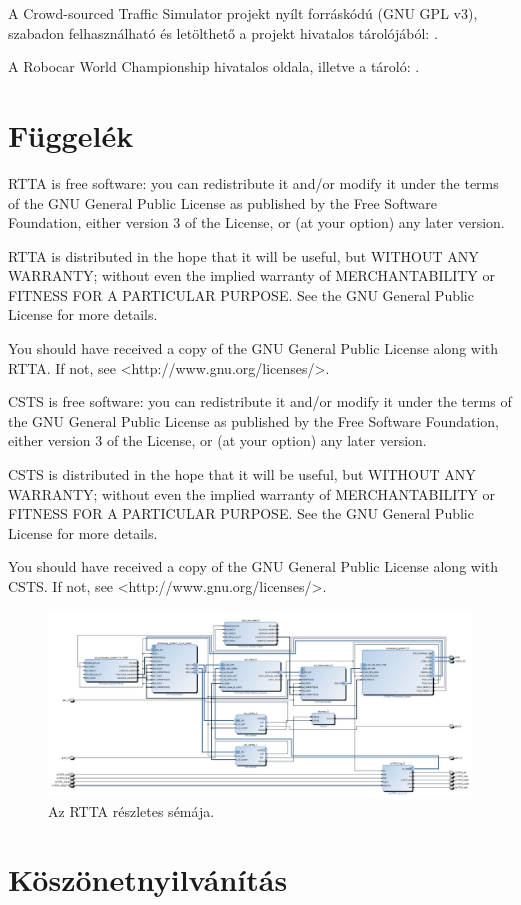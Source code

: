 \documentclass[a4paper,12pt]{report}
\begin{document}
A Crowd-sourced Traffic Simulator projekt nyílt forráskódú (GNU GPL v3), szabadon felhasználható és letölthető a projekt hivatalos tárolójából: \cite{csts}.

A Robocar World Championship hivatalos oldala, illetve a tároló: \cite{oocwcrepo}.


\chapter*{Függelék}

\noindent
RTTA is free software: you can redistribute it and/or modify
it under the terms of the GNU General Public License as published by
the Free Software Foundation, either version 3 of the License, or
(at your option) any later version.

\noindent
RTTA is distributed in the hope that it will be useful,
but WITHOUT ANY WARRANTY; without even the implied warranty of
MERCHANTABILITY or FITNESS FOR A PARTICULAR PURPOSE.  See the
GNU General Public License for more details.

\noindent
You should have received a copy of the GNU General Public License
along with RTTA. If not, see <http://www.gnu.org/licenses/>.

\noindent
CSTS is free software: you can redistribute it and/or modify
it under the terms of the GNU General Public License as published by
the Free Software Foundation, either version 3 of the License, or
(at your option) any later version.

\noindent
CSTS is distributed in the hope that it will be useful,
but WITHOUT ANY WARRANTY; without even the implied warranty of
MERCHANTABILITY or FITNESS FOR A PARTICULAR PURPOSE.  See the
GNU General Public License for more details.

\noindent
You should have received a copy of the GNU General Public License
along with CSTS. If not, see <http://www.gnu.org/licenses/>.


\begin{figure}
    \centering
    \includegraphics[width=10in]{img/base_design_1}
    \caption{Az RTTA részletes sémája.}
    \label{detailedscheme}
\end{figure}

\chapter*{Köszönetnyilvánítás}
\end{document}
